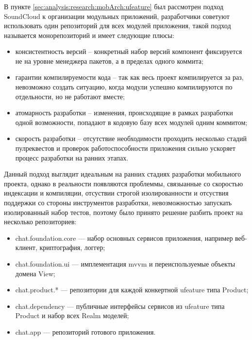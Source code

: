 \subsubsection{}
\label{sec:development:arch:ios:ufeature}

В пункте \ref{sec:analysis:research:mobArch:ufeature} был рассмотрен подход SoundCloud к организации модульных приложений, разработчики советуют использовать один репозиторий для всех модулей приложения, такой подход называется монорепозиторий и имеет следующие плюсы:

\begin{itemize}
\item консистентность версий -- конкретный набор версий компонент фиксируется не на уровне менеджера пакетов, а в пределах одного коммита;
\item гарантии компилируемости кода -- так как весь проект компилируется за раз, невозможно создать ситуацию, когда модули успешно компилируются по отдельности, но не работают вместе;
\item атомарность разработки -- изменения, происходящие в рамках разработки одной возможности, попадают в кодовую базу всех модулей одним коммитом;
\item скорость разработки -- отсутствие необходимости проходить несколько стадий пулреквестов и проверок работоспособности приложения сильно ускоряет процесс разработки на ранних этапах.
\end{itemize}

Данный подход выглядит идеальным на ранних стадиях разработки мобильного проекта, однако в реальности появляются проблеммы, связыанные со скоростью индексации и компиляции, отсуствии строгой изолированности и отсуствия поддержки со стороны инструментов разработки, невозможностью запускать изолированный набор тестов, поэтому было принято решение разбить проект на несколько репозиториев:

\begin{itemize}
\item chat.foundation.core --- набор основных сервисов приложения, например веб-клиент, криптография, логгер;
\item chat.foundation.ui --- имплементация \gls{mvvm} и переиспользуемые объекты домена View;
\item chat.product.* --- репозитории для каждой конкертной \gls{ufeature} типа Product;
\item chat.dependency --- публичные интерфейсы сервисов из \gls{ufeature} типа Product и набор всех Realm моделей;
\item chat.app --- репозиторий готового приложения.
\end{itemize}

